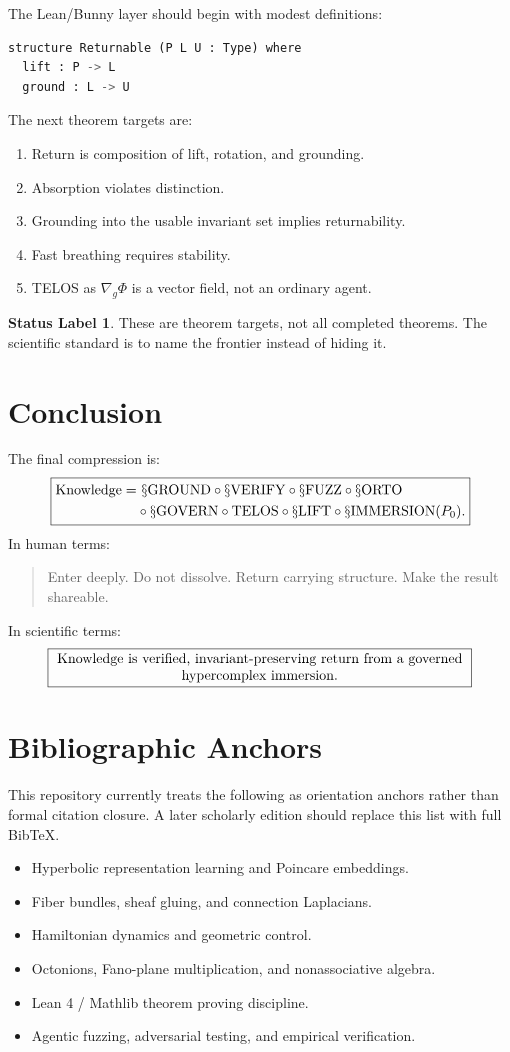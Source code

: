 \documentclass[11pt,oneside]{book}
\theoremstyle{definition}
\newtheorem{status}[definition]{Status Label}
\theoremstyle{plain}
\theoremstyle{remark}
\newcommand{\Sop}[1]{\mathsection\mathrm{#1}}
\newcommand{\Ground}{\Sop{GROUND}}
\newcommand{\Lift}{\Sop{LIFT}}
\newcommand{\Immersion}{\Sop{IMMERSION}}
\newcommand{\Telos}{\mathrm{TELOS}}
\begin{document}
The Lean/Bunny layer should begin with modest definitions:
\begin{lstlisting}[language=Python]
structure Returnable (P L U : Type) where
  lift : P -> L
  ground : L -> U
\end{lstlisting}
The next theorem targets are:
\begin{enumerate}[label=\textbf{T\arabic*.}]
\item Return is composition of lift, rotation, and grounding.
\item Absorption violates distinction.
\item Grounding into the usable invariant set implies returnability.
\item Fast breathing requires stability.
\item TELOS as \(\nabla_g\Phi\) is a vector field, not an ordinary agent.
\end{enumerate}

\begin{status}
These are theorem targets, not all completed theorems.  The scientific standard is to
name the frontier instead of hiding it.
\end{status}

\chapter{Conclusion}

The final compression is:
\[
\boxed{
\begin{aligned}
\mathrm{Knowledge}
=&\ \Ground\circ\Sop{VERIFY}\circ\Sop{FUZZ}\circ\Sop{ORTO}\\
&\circ\Sop{GOVERN}\circ\Telos\circ\Lift\circ\Immersion(P_0).
\end{aligned}}
\]
In human terms:
\begin{quote}
Enter deeply.  Do not dissolve.  Return carrying structure.  Make the result shareable.
\end{quote}
In scientific terms:
\[
\boxed{\parbox{0.86\textwidth}{\centering
Knowledge is verified, invariant-preserving return from a governed hypercomplex immersion.}}
\]

\backmatter
\chapter*{Bibliographic Anchors}
This repository currently treats the following as orientation anchors rather than formal
citation closure.  A later scholarly edition should replace this list with full BibTeX.
\begin{itemize}
\item Hyperbolic representation learning and Poincare embeddings.
\item Fiber bundles, sheaf gluing, and connection Laplacians.
\item Hamiltonian dynamics and geometric control.
\item Octonions, Fano-plane multiplication, and nonassociative algebra.
\item Lean 4 / Mathlib theorem proving discipline.
\item Agentic fuzzing, adversarial testing, and empirical verification.
\end{itemize}
\end{document}
